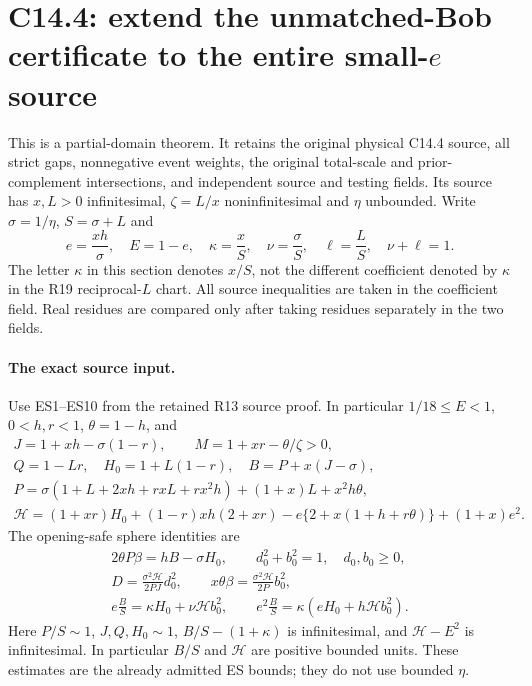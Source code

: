 \section{C14.4: extend the unmatched-Bob certificate to the entire small-$e$ source}
\label{sec:recovery-c144-small-e}

This is a partial-domain theorem. It retains the original physical C14.4
source, all strict gaps, nonnegative event weights, the original total-scale
and prior-complement intersections, and independent source and testing fields.
Its source has $x,L>0$ infinitesimal, $\zeta=L/x$ noninfinitesimal and
$\eta$ unbounded. Write $\sigma=1/\eta$, $S=\sigma+L$ and
\[
 e=\frac{xh}{\sigma},\quad E=1-e,\quad
 \kappa=\frac{x}{S},\quad \nu=\frac{\sigma}{S},\quad
 \ell=\frac{L}{S},\quad \nu+\ell=1.
 \tag{SE1}
\]
The letter $\kappa$ in this section denotes $x/S$, not the different
coefficient denoted by $\kappa$ in the R19 reciprocal-$L$ chart.
All source inequalities are taken in the coefficient field. Real residues
are compared only after taking residues separately in the two fields.

\paragraph{The exact source input.}
Use ES1--ES10 from the retained R13 source proof. In particular
$1/18\le E<1$, $0<h,r<1$, $\theta=1-h$, and
\[
\begin{gathered}
 J=1+xh-\sigma(1-r),\qquad M=1+xr-\theta/\zeta>0,\\
 Q=1-Lr,\quad H_0=1+L(1-r),\quad B=P+x(J-\sigma),\\
 P=\sigma(1+L+2xh+rxL+rx^2h)+(1+x)L+x^2h\theta,\\
 \mathcal H=(1+xr)H_0+(1-r)xh(2+xr)
       -e\{2+x(1+h+r\theta)\}+(1+x)e^2.
\end{gathered} \tag{SE2}
\]
The opening-safe sphere identities are
\[
\begin{gathered}
 2\theta P\beta=hB-\sigma H_0,\qquad
 d_0^2+b_0^2=1,\quad d_0,b_0\ge0,\\
 D=\frac{\sigma^2\mathcal H}{2PJ}d_0^2,\qquad
 x\theta\beta=\frac{\sigma^2\mathcal H}{2P}b_0^2,\\
 e\frac BS=\kappa H_0+\nu\mathcal H b_0^2,\qquad
 e^2\frac BS=\kappa(eH_0+h\mathcal H b_0^2).
\end{gathered}\tag{SE3}
\]
Here $P/S\sim1$, $J,Q,H_0\sim1$, $B/S-(1+\kappa)$ is
infinitesimal, and $\mathcal H-E^2$ is infinitesimal. In particular
$B/S$ and $\mathcal H$ are positive bounded units. These estimates
are the already admitted ES bounds; they do not use bounded $\eta$.

